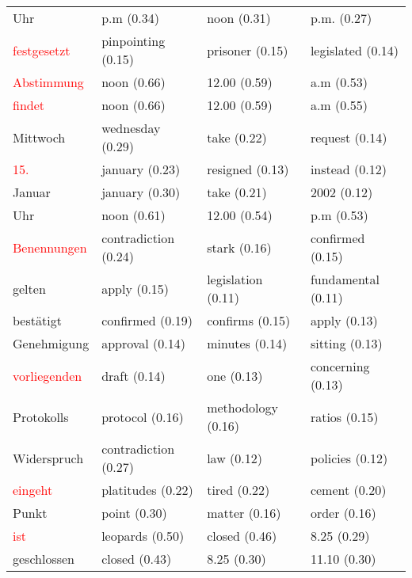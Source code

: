 \documentclass[11pt,twoside,openright]{mpreport}
\begin{document}
\begin{table}[H]
\begin{scriptsize}
\begin{tabular}{|llll|}
Uhr                     & p.m (0.34) & noon (0.31) & p.m. (0.27) \\ %
\textcolor{red}{festgesetzt}             & pinpointing (0.15) & prisoner (0.15) & legislated (0.14) \\ %
\textcolor{red}{Abstimmung}              & noon (0.66) & 12.00 (0.59) & a.m (0.53) \\
\textcolor{red}{findet}                  & noon (0.66) & 12.00 (0.59) & a.m (0.55) \\
Mittwoch                & wednesday (0.29) & take (0.22) & request (0.14) \\ %
\textcolor{red}{15.}                     & january (0.23) & resigned (0.13) & instead (0.12) \\
Januar                  & january (0.30) & take (0.21) & 2002 (0.12) \\ %
Uhr                     & noon (0.61) & 12.00 (0.54) & p.m (0.53) \\ %
\textcolor{red}{Benennungen}             & contradiction (0.24) & stark (0.16) & confirmed (0.15) \\
gelten                  & apply (0.15) & legislation (0.11) & fundamental (0.11) \\ %
bestätigt              & confirmed (0.19) & confirms (0.15) & apply (0.13) \\ %
Genehmigung             & approval (0.14) & minutes (0.14) & sitting (0.13) \\ %
\textcolor{red}{vorliegenden}            & draft (0.14) & one (0.13) & concerning (0.13) \\
Protokolls              & protocol (0.16) & methodology (0.16) & ratios (0.15) \\ %
Widerspruch             & contradiction (0.27) & law (0.12) & policies (0.12) \\ %
\textcolor{red}{eingeht}                 & platitudes (0.22) & tired (0.22) & cement (0.20) \\
Punkt                   & point (0.30) & matter (0.16) & order (0.16) \\ %
\textcolor{red}{ist}                     & leopards (0.50) & closed (0.46) & 8.25 (0.29) \\
geschlossen             & closed (0.43) & 8.25 (0.30) & 11.10 (0.30) \\ %
\hline
\end{tabular}
\end{scriptsize}
\end{table}
\end{document}

